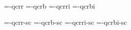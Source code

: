 

\ifx\sizespec\undefined \def\sizespec{}\fi
\ifx\font\corkencoded {}\else {}\fi

\font\tenrm=\tmp-qcrr  \sizespec
\font\tenbf=\tmp-qcrb  \sizespec
\font\tenit=\tmp-qcrri \sizespec
\font\tenbi=\tmp-qcrbi \sizespec

\font\tenrmc=\tmp-qcrr-sc  \sizespec
\font\tenbfc=\tmp-qcrb-sc  \sizespec
\font\tenitc=\tmp-qcrri-sc \sizespec
\font\tenbic=\tmp-qcrbi-sc \sizespec

\tenrm

\def\caps#1{{\escapechar=-1 \expandafter}%
  \expandafter\csname\expandafter\tenonlytext\string#1c\endcsname}
\def\tenonlytext{ten}

\ifx\font\corkencoded \else  \fi

\ifx\normalTXmath\undefined  \else\normalTXmath \fi


